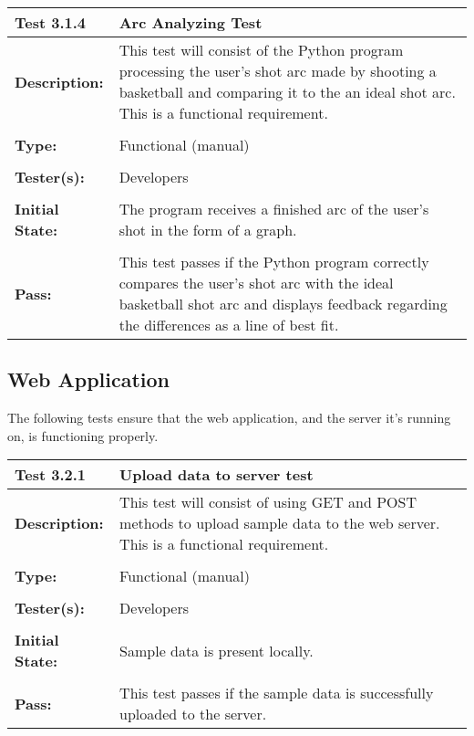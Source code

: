 \documentclass{article}
\begin{document}
\begin{tabularx}{\textwidth}{p{2cm}p{9cm}}
\toprule 
{\bf Test 3.1.4} & {\bf Arc Analyzing Test}\\
\midrule
\textbf{Description:} & This test will consist of the Python program processing the user's shot arc made by shooting a basketball and comparing it to the an ideal shot arc. This is a functional requirement. \\[0.3\baselineskip]
                      &                     \\
\textbf{Type:} & Functional (manual)   \\[0.3\baselineskip]
                      &                     \\
\textbf{Tester(s):} & Developers \\[0.3\baselineskip]
                      &                     \\
\textbf{Initial State:} & The program receives a finished arc of the user's shot in the form of a graph. \\[0.3\baselineskip]
                      &                     \\
\textbf{Pass:} & This test passes if the Python program correctly compares the user's shot arc with the ideal basketball shot arc and displays feedback regarding the differences as a line of best fit.  \\[0.3\baselineskip]
\bottomrule
\end{tabularx}


\newpage
\subsection {Web Application}
The following tests ensure that the web application, and the server it's running on, is functioning properly.

\begin{tabularx}{\textwidth}{p{2cm}p{9cm}}
\toprule 
{\bf Test 3.2.1 } & {\bf Upload data to server test}\\
\midrule
\textbf{Description:} & This test will consist of using GET and POST methods to upload sample data to the web server. This is a functional requirement. \\[0.3\baselineskip]
                      &                     \\
\textbf{Type:} & Functional (manual)   \\[0.3\baselineskip]
                      &                     \\
\textbf{Tester(s):} & Developers \\[0.3\baselineskip]
                      &                     \\
\textbf{Initial State:} & Sample data is present locally. \\[0.3\baselineskip]
                      &                     \\
\textbf{Pass:} & This test passes if the sample data is successfully uploaded to the server.\\[0.3\baselineskip]
\end{tabularx}
\end{document}
